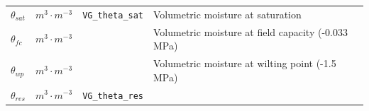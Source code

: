 \documentclass[]{book}
\begin{document}
\begin{longtable}[]{@{}llll@{}}
\begin{minipage}[t]{0.11\columnwidth}\raggedright
\(\theta_{sat}\)\strut
\end{minipage} & \begin{minipage}[t]{0.10\columnwidth}\raggedright
\(m^3 \cdot m^{-3}\)\strut
\end{minipage} & \begin{minipage}[t]{0.12\columnwidth}\raggedright
\texttt{VG\_theta\_sat}\strut
\end{minipage} & \begin{minipage}[t]{0.45\columnwidth}\raggedright
Volumetric moisture at saturation\strut
\end{minipage}\tabularnewline
\begin{minipage}[t]{0.11\columnwidth}\raggedright
\(\theta_{fc}\)\strut
\end{minipage} & \begin{minipage}[t]{0.10\columnwidth}\raggedright
\(m^3 \cdot m^{-3}\)\strut
\end{minipage} & \begin{minipage}[t]{0.12\columnwidth}\raggedright
\strut
\end{minipage} & \begin{minipage}[t]{0.45\columnwidth}\raggedright
Volumetric moisture at field capacity (-0.033 MPa)\strut
\end{minipage}\tabularnewline
\begin{minipage}[t]{0.11\columnwidth}\raggedright
\(\theta_{wp}\)\strut
\end{minipage} & \begin{minipage}[t]{0.10\columnwidth}\raggedright
\(m^3 \cdot m^{-3}\)\strut
\end{minipage} & \begin{minipage}[t]{0.12\columnwidth}\raggedright
\strut
\end{minipage} & \begin{minipage}[t]{0.45\columnwidth}\raggedright
Volumetric moisture at wilting point (-1.5 MPa)\strut
\end{minipage}\tabularnewline
\begin{minipage}[t]{0.11\columnwidth}\raggedright
\(\theta_{res}\)\strut
\end{minipage} & \begin{minipage}[t]{0.10\columnwidth}\raggedright
\(m^3 \cdot m^{-3}\)\strut
\end{minipage} & \begin{minipage}[t]{0.12\columnwidth}\raggedright
\texttt{VG\_theta\_res}\strut

\end{minipage}
\end{longtable}
\end{document}
